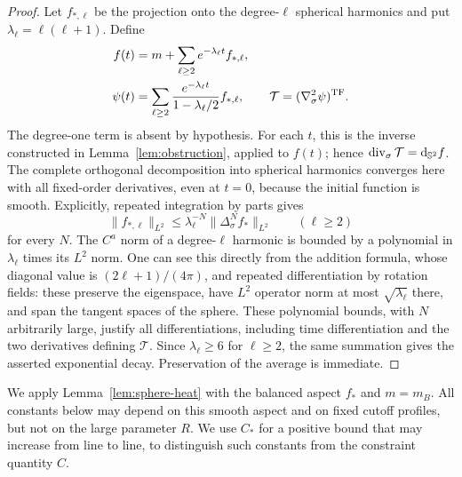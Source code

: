 \begin{proof}
Let $f_{*,\ell}$ be the projection onto the degree-$\ell$ spherical
harmonics and put $\lambda_\ell=\ell(\ell+1)$. Define
\begin{equation}\label{eq:spherical-series}
 \begin{split}
 f(t)&=m+\sum_{\ell\geq2}e^{-\lambda_\ell t}f_{*,\ell},\\
 \psi(t)&=\sum_{\ell\geq2}
       \frac{e^{-\lambda_\ell t}}{1-\lambda_\ell/2}f_{*,\ell},
 \qquad
 \mathcal T=(\nabla_\sigma^2\psi)^{\mathrm{TF}}.
 \end{split}
\end{equation}
The degree-one term is absent by hypothesis. For each $t$, this is
the inverse constructed in Lemma~\ref{lem:obstruction}, applied to
$f(t)$; hence $\operatorname{div}_\sigma\mathcal T=\mathrm d_{\mathbb S^2}f$.
The complete orthogonal decomposition into spherical harmonics
converges here with all fixed-order derivatives, even at $t=0$, because
the initial function is smooth. Explicitly, repeated integration by
parts gives
\[
 \|f_{*,\ell}\|_{L^2}
   \leq \lambda_\ell^{-N}\|\Delta_\sigma^N f_*\|_{L^2}
   \qquad (\ell\geq2)
\]
for every $N$. The $C^a$ norm of a degree-$\ell$ harmonic is bounded
by a polynomial in $\lambda_\ell$ times its $L^2$ norm. One can see
this directly from the addition formula, whose diagonal value is
$(2\ell+1)/(4\pi)$, and repeated differentiation by rotation fields:
these preserve the eigenspace, have $L^2$ operator norm at most
$\sqrt{\lambda_\ell}$ there, and span the tangent spaces of the sphere.
These polynomial bounds, with $N$ arbitrarily large, justify all
differentiations, including time differentiation and the two
derivatives defining $\mathcal T$. Since $\lambda_\ell\geq6$ for
$\ell\geq2$, the same summation gives the asserted exponential
decay. Preservation of the average is immediate.
\end{proof}

We apply Lemma~\ref{lem:sphere-heat} with the balanced aspect $f_*$
and $m=m_B$. All constants below may depend on this smooth aspect
and on fixed cutoff profiles, but not on the large parameter $R$.
We use $C_*$ for a positive bound that may increase from line to line,
to distinguish such constants from the constraint quantity $C$.

